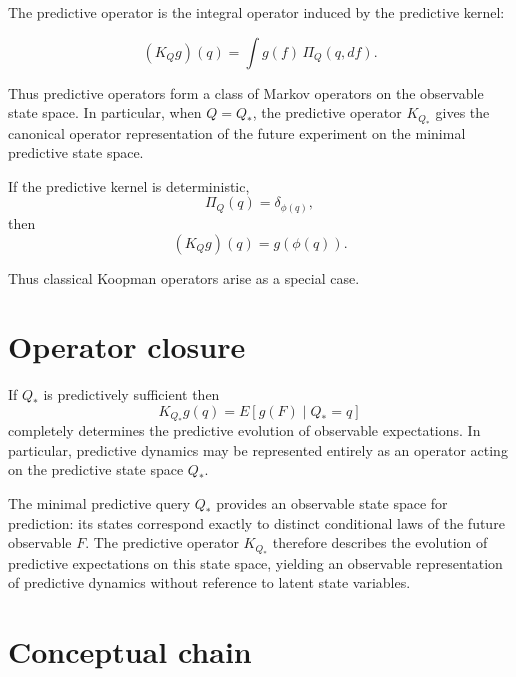 \begin{remark}
The predictive operator is the integral operator induced by the
predictive kernel:

\[
(K_Q g)(q)
=
\int g(f)\,\Pi_Q(q,df).
\]

Thus predictive operators form a class of Markov operators on the
observable state space.  In particular, when $Q=Q_*$, the predictive
operator $K_{Q_*}$ gives the canonical operator representation of the
future experiment on the minimal predictive state space.
\end{remark}

\begin{proposition}
If the predictive kernel is deterministic,
\[
\Pi_Q(q)=\delta_{\phi(q)},
\]
then
\[
(K_Q g)(q)=g(\phi(q)).
\]
\end{proposition}

Thus classical Koopman operators arise as a special case.

\bigskip

\section{Operator closure}\label{sec:operator-closure}

\begin{corollary}
If $Q_*$ is predictively sufficient then
\[
K_{Q_*}g(q)=E[g(F)\mid Q_*=q]
\]
completely determines the predictive evolution of observable
expectations.
In particular, predictive dynamics may be represented entirely as
an operator acting on the predictive state space $Q_*$.
\end{corollary}

\begin{remark}
The minimal predictive query $Q_*$ provides an observable state space
for prediction: its states correspond exactly to distinct conditional
laws of the future observable $F$.  The predictive operator $K_{Q_*}$
therefore describes the evolution of predictive expectations on this
state space, yielding an observable representation of predictive
dynamics without reference to latent state variables.
\end{remark}


\section{Conceptual chain}

